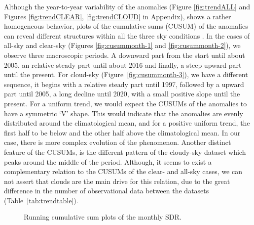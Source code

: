 \documentclass[applsci,article,submit,moreauthors,pdftex]{Definitions/mdpi}
\begin{document}
Although the year-to-year variability of the anomalies (Figure
\ref{fig:trendALL} and Figures \ref{fig:trendCLEAR},
\ref{fig:trendCLOUD} in Appendix), shows a rather homogeneous behavior,
plots of the cumulative sums (CUSUM) of the anomalies can reveal
different structures within all the three sky conditions
\citep{Regier2019}. In the cases of all-sky and clear-sky (Figures
\ref{fig:cusummonth-1} and \ref{fig:cusummonth-2}), we observe three
macroscopic periods. A downward part from the start until about 2005, an
relative steady part until about 2016 and finally, a steep upward part
until the present. For cloud-sky (Figure~\ref{fig:cusummonth-3}), we
have a different sequence, it begins with a relative steady part until
1997, followed by a upward part until 2005, a long decline until 2020,
with a small positive slope until the present. For a uniform trend, we
would expect the CUSUMs of the anomalies to have a symmetric `V' shape.
This would indicate that the anomalies are evenly distributed around the
climatological mean, and for a positive uniform trend, the first half to
be below and the other half above the climatological mean. In our case,
there is more complex evolution of the phenomenon. Another distinct
feature of the CUSUMs, is the different pattern of the cloudy-sky
dataset which peaks around the middle of the period. Although, it seems
to exist a complementary relation to the CUSUMs of the clear- and
all-sky cases, we can not assert that clouds are the main drive for this
relation, due to the great difference in the number of observational
data between the datasets (Table~\ref{tab:trendtable}).

\begin{figure}[h!]

{\centering {}

}

\caption{Running cumulative sum plots of the monthly SDR.}\label{fig:cusummonth}
\end{figure}
\end{document}
